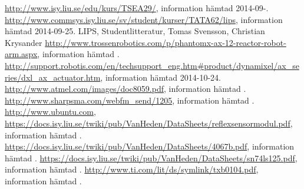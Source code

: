 
\begin{thebibliography}{9}
	\url{http://www.isy.liu.se/edu/kurs/TSEA29/}, information hämtad 2014-09-.
	\url{http://www.commsys.isy.liu.se/sv/student/kurser/TATA62/lips}, information hämtad 2014-09-25.
	LIPS, Studentlitteratur, Tomas Svensson, Christian Krysander 
	\url{http://www.trossenrobotics.com/p/phantomx-ax-12-reactor-robot-arm.aspx}, information hämtad .
	\url{http://support.robotis.com/en/techsupport_eng.htm#product/dynamixel/ax_series/dxl_ax_actuator.htm}, information hämtad 	2014-10-24.
	\url{http://www.atmel.com/images/doc8059.pdf}, information hämtad .
	\url{http://www.sharpsma.com/webfm_send/1205}, information hämtad .
	\url{http://www.ubuntu.com}, 
	\url{https://docs.isy.liu.se/twiki/pub/VanHeden/DataSheets/reflexsensormodul.pdf}, information hämtad .
	\url{https://docs.isy.liu.se/twiki/pub/VanHeden/DataSheets/4067b.pdf}, information hämtad .
	\url{https://docs.isy.liu.se/twiki/pub/VanHeden/DataSheets/sn74ls125.pdf}, information hämtad .
	\url{http://www.ti.com/lit/ds/symlink/txb0104.pdf}, information hämtad .
\end{thebibliography}


{} \newline
{} \newline
{} \newline

